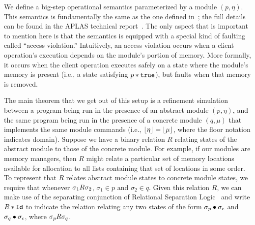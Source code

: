 We define a big-step operational semantics parameterized by a module $(p,\eta)$. This semantics is fundamentally the same as the
one defined in~\cite{filipovic10}; the full details can be found in the 
APLAS technical report~\cite{costanzo12:bpsltr}. The only aspect that is important to mention 
here is that the semantics is equipped with a special kind of faulting called ``access violation.'' Intuitively, an access
violation occurs when a client operation's execution depends on the module's portion of memory. More formally, it 
occurs when the client operation executes safely on a state where the module's memory is present (i.e., a state satisfying
$p*\true$), but faults when that memory is removed.

The main theorem that we get out of this setup is a refinement simulation between a program being run in the presence of an abstract module $(p,\eta)$, and
the same program being run in the presence of a concrete module $(q,\mu)$ that implements the same module commands (i.e., $\dom{\eta} = \dom{\mu}$, where
the floor notation indicates domain).
Suppose we have a binary relation $R$ relating states of the abstract module to those of the concrete module. For example, if our modules are memory
managers, then $R$ might relate a particular set of memory locations available for allocation to all lists containing that set of locations in some order.
To represent that $R$ relates abstract module states to concrete module states, we require that whenever $\relate{R}{\sigma_1}{\sigma_2}$,
$\sigma_1 \in p$ and $\sigma_2 \in q$. Given this relation $R$, we can make use of the separating conjunction of 
Relational Separation Logic~\cite{yang07} and write $R*\id$ to indicate the relation relating any two states of the form 
$\sigma_p \dt \sigma_c$ and $\sigma_q \dt \sigma_c$, where $\relate{R}{\sigma_p}{\sigma_q}$.

